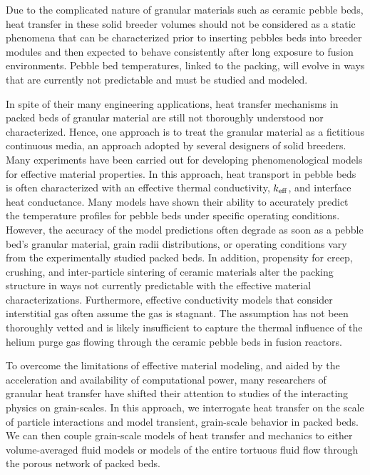 Due to the complicated nature of granular materials such as ceramic pebble beds, heat transfer in these solid breeder volumes should not be considered as a static phenomena that can be characterized prior to inserting pebbles beds into breeder modules and then expected to behave consistently after long exposure to fusion environments. Pebble bed temperatures, linked to the packing, will evolve in ways that are currently not predictable and must be studied and modeled.

In spite of their many engineering applications, heat transfer mechanisms in packed beds of granular material are still not thoroughly understood nor characterized. Hence, one approach is to treat the granular material as a fictitious continuous media, an approach adopted by several designers of solid breeders. Many experiments have been carried out for developing phenomenological models for effective material properties. In this approach, heat transport in pebble beds is often characterized with an effective thermal conductivity, $k_\text{eff}$, and interface heat conductance. Many models have shown their ability to accurately predict the temperature profiles for pebble beds under specific operating conditions. However, the accuracy of the model predictions often degrade as soon as a pebble bed's granular material, grain radii distributions, or operating conditions vary from the experimentally studied packed beds. In addition, propensity for creep, crushing, and inter-particle sintering of ceramic materials alter the packing structure in ways not currently predictable with the effective material characterizations. Furthermore, effective conductivity models that consider interstitial gas often assume the gas is stagnant. The assumption has not been thoroughly vetted and is likely insufficient to capture the thermal influence of the helium purge gas flowing through the ceramic pebble beds in fusion reactors.

To overcome the limitations of effective material modeling, and aided by the acceleration and availability of computational power, many researchers of granular heat transfer have shifted their attention to studies of the interacting physics on grain-scales. In this approach, we interrogate heat transfer on the scale of particle interactions and model transient, grain-scale behavior in packed beds. We can then couple grain-scale models of heat transfer and mechanics to either volume-averaged fluid models or models of the entire tortuous fluid flow through the porous network of packed beds.



